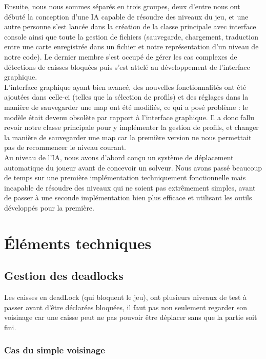 \documentclass[a4paper,12pt]{article} %
\begin{document}
Ensuite, nous nous sommes séparés en trois groupes, deux d'entre nous ont débuté la conception d'une IA capable de résoudre des niveaux du jeu, et une autre personne s'est lancée dans la création de la classe principale avec interface console ainsi que toute la gestion de fichiers (sauvegarde, chargement, traduction entre une carte enregistrée dans un fichier et notre représentation d'un niveau de notre code). Le dernier membre s'est occupé de gérer les cas complexes de détections de caisses bloquées puis s'est attelé au développement de l'interface graphique.\\

L'interface graphique ayant bien avancé, des nouvelles fonctionnalités ont été ajoutées dans celle-ci (telles que la sélection de profils) et des réglages dans la manière de sauvegarder une map ont été modifiés, ce qui a posé problème : le modèle était devenu obsolète par rapport à l'interface graphique. Il a donc fallu revoir notre classe principale pour y implémenter la gestion de profils, et changer la manière de sauvegarder une map car la première version ne nous permettait pas de recommencer le niveau courant.\\

Au niveau de l'IA, nous avons d'abord conçu un système de déplacement automatique du joueur avant de concevoir un solveur. Nous avons passé beaucoup de temps sur une première implémentation techniquement fonctionnelle mais incapable de résoudre des niveaux qui ne soient pas extrêmement simples, avant de passer à une seconde implémentation bien plus efficace et utilisant les outils développés pour la première. 

\section{Éléments techniques}\label{et}

\subsection{Gestion des deadlocks}

Les caisses en deadLock (qui bloquent le jeu), ont plusieurs niveaux de test à passer avant d'être déclarées bloquées, il faut pas non seulement regarder son voisinage car une caisse peut ne pas pouvoir être déplacer sans que la partie soit fini.

\subsubsection{Cas du simple voisinage}
\end{document}
